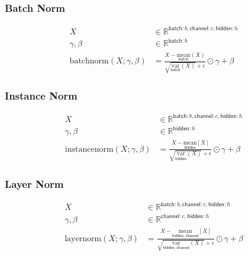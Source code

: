 \documentclass{article}
\newcommand{\reals}[0]{\mathbb{R}}
\newcommand{\nfun}[2]{\underset{\name{#1}}{#2}}
\newcommand{\name}[1]{\mathsf{#1}}
\begin{document}



\subsubsection*{Batch Norm}

\begin{align*} 
X &\in \reals^{{\name{batch}:b, \name{channel}:c, \name{hidden}:h}}\\
\gamma, \beta &\in \reals^{{\name{batch}:b}} \\
\text{batchnorm}(X; \gamma, \beta) &= \frac{X - \nfun{batch}{\text{mean}}(X)}{\sqrt{\nfun{batch}{\text{var}}(X)} + \epsilon } \odot \gamma + \beta
\end{align*}


\subsubsection*{Instance Norm}

\begin{align*} 
X &\in \reals^{{\name{batch}:b, \name{channel}:c, \name{hidden}:h}}\\
\gamma, \beta &\in \reals^{{\name{hidden}:h}} \\
\text{instancenorm}(X; \gamma, \beta) &= \frac{X - \nfun{hidden}{\text{mean}}[X]}{\sqrt{\nfun{hidden}{\text{var}}(X)} + \epsilon } \odot \gamma + \beta
\end{align*}

\subsubsection*{Layer Norm}

\begin{align*} 
X &\in \reals^{{\name{batch}:b, \name{channel}:c, \name{hidden}:h}} \\
\gamma, \beta &\in \reals^{{\name{channel}:c, \name{hidden}:h}} \\
\text{layernorm}(X; \gamma, \beta) &= \frac{X - \nfun{hidden,channel}{\text{mean}}[X]}{\sqrt{\nfun{hidden, channel}{\text{var}}(X)} + \epsilon } \odot \gamma + \beta 
\end{align*}
\end{document}
